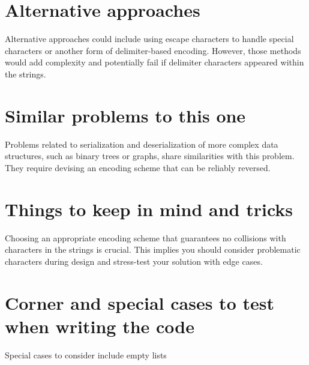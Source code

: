 \section*{Alternative approaches}
Alternative approaches could include using escape characters to handle special characters or another form of delimiter-based encoding. However, those methods would add complexity and potentially fail if delimiter characters appeared within the strings.

\section*{Similar problems to this one}
Problems related to serialization and deserialization of more complex data structures, such as binary trees or graphs, share similarities with this problem. They require devising an encoding scheme that can be reliably reversed.

\section*{Things to keep in mind and tricks}
Choosing an appropriate encoding scheme that guarantees no collisions with characters in the strings is crucial. This implies you should consider problematic characters during design and stress-test your solution with edge cases.

\section*{Corner and special cases to test when writing the code}
Special cases to consider include empty lists